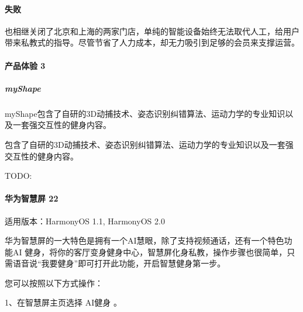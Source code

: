\documentclass[letterpaper,11pt,english]{sphinxmanual}
\begin{document}
\paragraph{失败}
\label{\detokenize{chapter_project/AI_fit:id4}}
也相继关闭了北京和上海的两家门店，单纯的智能设备始终无法取代人工，给用户带来私教式的指导。尽管节省了人力成本，却无力吸引到足够的会员来支撑运营。


\paragraph{产品体验 3\sphinxfootnotemark[241]}
\label{\detokenize{chapter_project/AI_fit:id5}}%
\begin{footnotetext}[241]\sphinxAtStartFootnote
{}
%
\end{footnotetext}\ignorespaces 

\subparagraph{myShape}
\label{\detokenize{chapter_project/AI_fit:myshape}}

myShape包含了自研的3D动捕技术、姿态识别纠错算法、运动力学的专业知识以及一套强交互性的健身内容。

包含了自研的3D动捕技术、姿态识别纠错算法、运动力学的专业知识以及一套强交互性的健身内容。

TODO:


\paragraph{华为智慧屏 22\sphinxfootnotemark[242]}
\label{\detokenize{chapter_project/AI_fit:id6}}%
\begin{footnotetext}[242]\sphinxAtStartFootnote
{}
%
\end{footnotetext}\ignorespaces 
适用版本：HarmonyOS 1.1, HarmonyOS 2.0

华为智慧屏的一大特色是拥有一个AI慧眼，除了支持视频通话，还有一个特色功能AI
健身，将你的客厅变身健身中心，智慧屏化身私教，操作步骤也很简单，只需语音说“我要健身”即可打开此功能，开启智慧健身第一步。%
\begin{footnote}[243]\sphinxAtStartFootnote
{}
%
\end{footnote}

您可以按照以下方式操作：

1、在智慧屏主页选择 AI健身 。
\end{document}
